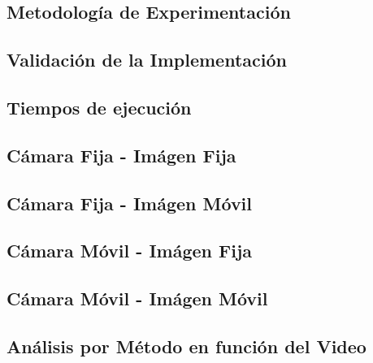 \subsection{Metodolog\'ia de Experimentaci\'on}\label{subsec:metodologia}


\newpage
\subsection{Validaci\'on de la Implementaci\'on}


\newpage
\subsection{Tiempos de ejecuci\'on}


\newpage
\subsection{C\'amara Fija - Im\'agen Fija}\label{subsec:fija-fija}


\newpage
\subsection{C\'amara Fija - Im\'agen M\'ovil}


\newpage
\subsection{C\'amara M\'ovil - Im\'agen Fija}


\newpage
\subsection{C\'amara M\'ovil - Im\'agen M\'ovil}


\newpage
\subsection{An\'alisis por M\'etodo en funci\'on del Video}

